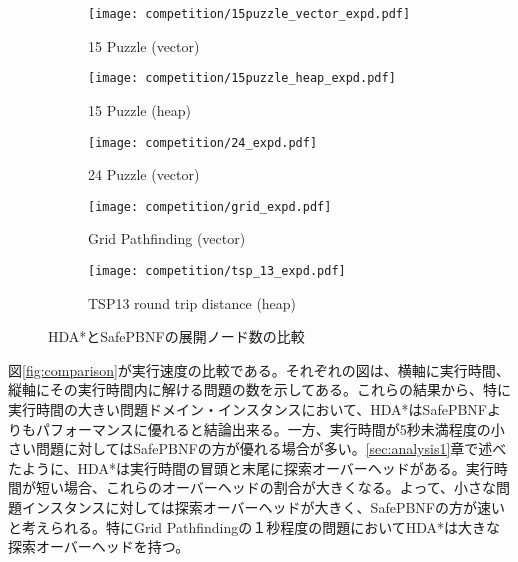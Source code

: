 \documentclass[uplatex]{jsarticle}
\begin{document}
\begin{figure}[h]
	\centering
	\begin{subfigure}{0.4\columnwidth}
		\texttt{[image: competition/15puzzle\_vector\_expd.pdf]}
		\caption{15 Puzzle (vector)}
		\label{fig:15puzzle_vector_expd}
	\end{subfigure}
	\begin{subfigure}{0.4\columnwidth}
		\texttt{[image: competition/15puzzle\_heap\_expd.pdf]}
		\caption{15 Puzzle (heap)}
		\label{fig:15puzzle_heap_expd}
	\end{subfigure}
	\begin{subfigure}{0.4\columnwidth}
		\texttt{[image: competition/24\_expd.pdf]}
		\caption{24 Puzzle (vector)}
		\label{fig:24puzzle_vector_expd}
	\end{subfigure}
	\begin{subfigure}{0.4\columnwidth}
		\texttt{[image: competition/grid\_expd.pdf]}
		\caption{Grid Pathfinding (vector)}
		\label{fig:grid_expd}
	\end{subfigure}
	\begin{subfigure}{0.4\columnwidth}
		\texttt{[image: competition/tsp\_13\_expd.pdf]}
		\caption{TSP13 round trip distance (heap)}
		\label{fig:tsp_13_expd}
	\end{subfigure}
	\caption{HDA*とSafePBNFの展開ノード数の比較}
	\label{fig:comparison_expd}
\end{figure}%


図\ref{fig:comparison}が実行速度の比較である。それぞれの図は、横軸に実行時間、縦軸にその実行時間内に解ける問題の数を示してある。これらの結果から、特に実行時間の大きい問題ドメイン・インスタンスにおいて、HDA*はSafePBNFよりもパフォーマンスに優れると結論出来る。一方、実行時間が5秒未満程度の小さい問題に対してはSafePBNFの方が優れる場合が多い。\ref{sec:analysis1}章で述べたように、HDA*は実行時間の冒頭と末尾に探索オーバーヘッドがある。実行時間が短い場合、これらのオーバーヘッドの割合が大きくなる。よって、小さな問題インスタンスに対しては探索オーバーヘッドが大きく、SafePBNFの方が速いと考えられる。特にGrid Pathfindingの１秒程度の問題においてHDA*は大きな探索オーバーヘッドを持つ。
\newline
\end{document}
